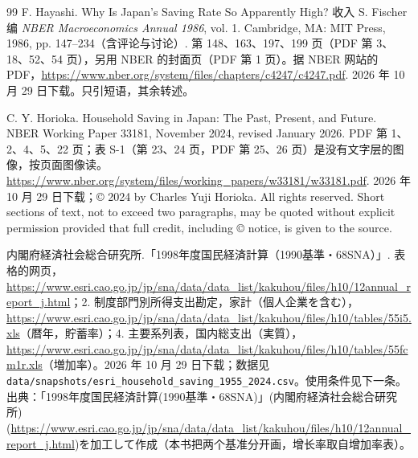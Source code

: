 \begin{thebibliography}{99}
 F. Hayashi. Why Is Japan's Saving Rate So Apparently High? 收入 S. Fischer 编 \emph{NBER Macroeconomics Annual 1986}, vol. 1. Cambridge, MA: MIT Press, 1986, pp. 147--234（含评论与讨论）. 第 148、163、197、199 页（PDF 第 3、18、52、54 页），另用 NBER 的封面页（PDF 第 1 页）。据 NBER 网站的 PDF，\url{https://www.nber.org/system/files/chapters/c4247/c4247.pdf}. 2026 年 10 月 29 日下载。只引短语，其余转述。

 C. Y. Horioka. Household Saving in Japan: The Past, Present, and Future. NBER Working Paper 33181, November 2024, revised January 2026. PDF 第 1、2、4、5、22 页；表 S-1（第 23、24 页，PDF 第 25、26 页）是没有文字层的图像，按页面图像读。\url{https://www.nber.org/system/files/working_papers/w33181/w33181.pdf}. 2026 年 10 月 29 日下载；© 2024 by Charles Yuji Horioka. All rights reserved. Short sections of text, not to exceed two paragraphs, may be quoted without explicit permission provided that full credit, including © notice, is given to the source.

 内閣府経済社会総合研究所.「1998年度国民経済計算（1990基準・68SNA）」. 表格的网页，\url{https://www.esri.cao.go.jp/jp/sna/data/data_list/kakuhou/files/h10/12annual_report_j.html}；2. 制度部門別所得支出勘定，家計（個人企業を含む），\url{https://www.esri.cao.go.jp/jp/sna/data/data_list/kakuhou/files/h10/tables/55i5.xls}（暦年，貯蓄率）；4. 主要系列表，国内総支出（実質），\url{https://www.esri.cao.go.jp/jp/sna/data/data_list/kakuhou/files/h10/tables/55fcm1r.xls}（増加率）。2026 年 10 月 29 日下载；数据见 \texttt{data/snapshots/esri\_household\_saving\_1955\_2024.csv}。使用条件见下一条。出典：「1998年度国民経済計算(1990基準・68SNA)」(内閣府経済社会総合研究所)(\url{https://www.esri.cao.go.jp/jp/sna/data/data_list/kakuhou/files/h10/12annual_report_j.html})を加工して作成（本书把两个基准分开画，增长率取自增加率表）。


\end{thebibliography}
